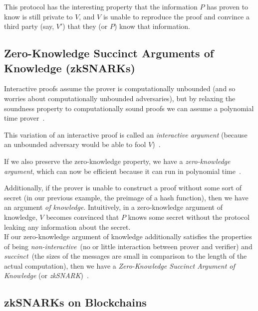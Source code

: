 This protocol has the interesting property that the information $P$ has proven to know is still private to $V$, and
$V$ is unable to reproduce the proof and convince a third party (say, $V'$) that they (or $P$) know that information.

\subsection[zkSNARKs]{Zero-Knowledge Succinct Arguments of Knowledge (zkSNARKs)}\label{subsec:zksnarks}


Interactive proofs assume the prover is computationally unbounded (and so worries about computationally
unbounded adversaries), but by relaxing the soundness property to computationally sound proofs we can assume a
polynomial time prover~\cite{damgaard1998zk_protocols}.

This variation of an interactive proof is called an \textit{interactive argument} (because an unbounded adversary would
be able to fool $V$)~\cite{smart2016zeroknowledgeproofs}.

If we also preserve the zero-knowledge property, we have a \textit{zero-knowledge argument}, which can now be
efficient because it can run in polynomial time~\cite{naranker2022zeroknowledge}.

Additionally, if the prover is unable to construct a proof without some sort of secret (in our previous example, the
preimage of a hash function), then we have an argument \textit{of knowledge}.
Intuitively, in a zero-knowledge argument of knowledge, $V$ becomes convinced that $P$ knows some secret without the
protocol leaking any information about the secret.\\

If our zero-knowledge argument of knowledge additionally satisfies the properties of being \textit{non-interactive}~(no
or little interaction between prover and verifier) and \textit{succinct}~(the sizes of the messages are small in
comparison to the length of the actual computation), then we have a \textit{Zero-Knowledge Succinct Argument of
Knowledge} (or \textit{zkSNARK})~\cite{reitwiessner2016zksnarks}.

\subsection{zkSNARKs on Blockchains}\label{subsec:onchain-snarks}

